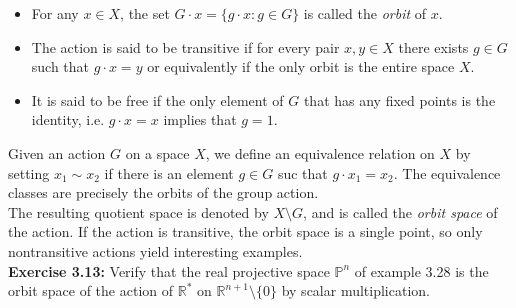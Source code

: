 \documentclass{article}
\begin{document}
  \begin{itemize}
      \item For any \(x\in X\), the set \(G\cdot x=\{g\cdot x:g\in G\}\) is called the \textit{orbit} of \(x\).
      \item The action is said to be transitive if for every pair \(x,y\in X\) there exists \(g\in G\) such that \(g\cdot x=y\) or equivalently if the only orbit is the entire space \(X\).
      \item It is said to be free if the only element of \(G\) that has any fixed points is the identity, i.e. \(g\cdot x=x\) implies that \(g=1\).
  \end{itemize}

  Given an action \(G\) on a space \(X\), we define an equivalence relation on \(X\) by setting \(x_1\sim x_2\) if  there is an element \(g\in G\) suc that \(g\cdot x_1 = x_2\). The equivalence classes are precisely the orbits of the group action.\\
  The resulting quotient space is denoted by \(X\setminus G\), and is called the \textit{orbit space} of the action. If the action is transitive, the orbit space is a single point, so only nontransitive actions yield interesting examples.\\
  \textbf{Exercise 3.13:} Verify that the real projective space \(\mathbb{P}^n\) of example 3.28 is the orbit space of the action of \(\mathbb{R}^*\) on \(\mathbb{R}^{n+1}\setminus\{0\}\) by scalar multiplication.\\
  \\
\end{document}
